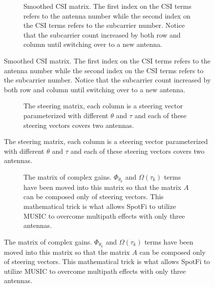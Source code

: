 \documentclass[12pt]{report}
\begin{document}
\begin{figure}%
    \begin{center}
        \caption{The smoothed CSI matrix constructed in SpotFi and the matrices $A$ and $F$ which are specifically constructed to be compatible with MUSIC.}
        \label{figure: spotfi-smoothing-explained}
        \begin{subfigure}[b]{0.75\textwidth}
            \caption{Smoothed CSI matrix. The first index on the CSI terms refers to the antenna number while the second index on the CSI terms refers to the subcarrier number. Notice that the subcarrier count increased by both row and column until switching over to a new antenna.}
            \label{subfigure: smoothed-csi-matrix}
            \centerline{\scalebox{0.95}{}}
        \end{subfigure}
    \end{center}
\end{figure}
\begin{figure}%
    \begin{center}
        \ContinuedFloat
        \par\bigskip
        \begin{subfigure}[b]{0.75\textwidth}
            \caption{The steering matrix, each column is a steering vector parameterized with different $\theta$ and $\tau$ and each of these steering vectors covers two antennas. }
            \label{subfigure: steering-matrix}
            \centerline{\scalebox{0.85}{}}
        \end{subfigure}
    \end{center}
\end{figure}
\begin{figure}%
    \begin{center}
        \ContinuedFloat
        \par\bigskip
        \begin{subfigure}[b]{0.75\textwidth}
            \caption{The matrix of complex gains. $\Phi_{\theta_{k}}$ and $\Omega(\tau_{k})$ terms have been moved into this matrix so that the matrix $A$ can be composed only of steering vectors. This mathematical trick is what allows SpotFi to utilize MUSIC to overcome multipath effects with only three antennas.}
            \label{subfigure: complex-gains-matrix}
            \centerline{\scalebox{0.65}{}}
        \end{subfigure}
        \par\bigskip
    \end{center}
\end{figure}
\end{document}
